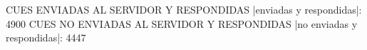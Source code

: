 CUES ENVIADAS AL SERVIDOR Y RESPONDIDAS
|enviadas y respondidas|: 4900
CUES NO ENVIADAS AL SERVIDOR Y RESPONDIDAS
|no enviadas y respondidas|: 4447